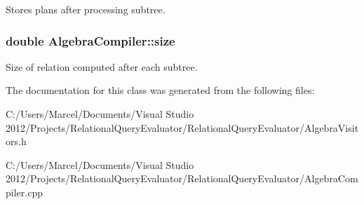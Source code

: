 Stores plans after processing subtree. \hypertarget{class_algebra_compiler_adcc3f8ba764b873c170cfb28d4636b16}{
\subsubsection[{size}]{\setlength{\rightskip}{0pt plus 5cm}double Algebra\+Compiler\+::size}}\label{class_algebra_compiler_adcc3f8ba764b873c170cfb28d4636b16}
Size of relation computed after each subtree. 

The documentation for this class was generated from the following files\+:\begin{DoxyCompactItemize}
\item 
C\+:/\+Users/\+Marcel/\+Documents/\+Visual Studio 2012/\+Projects/\+Relational\+Query\+Evaluator/\+Relational\+Query\+Evaluator/Algebra\+Visitors.\+h\item 
C\+:/\+Users/\+Marcel/\+Documents/\+Visual Studio 2012/\+Projects/\+Relational\+Query\+Evaluator/\+Relational\+Query\+Evaluator/Algebra\+Compiler.\+cpp\end{DoxyCompactItemize}
